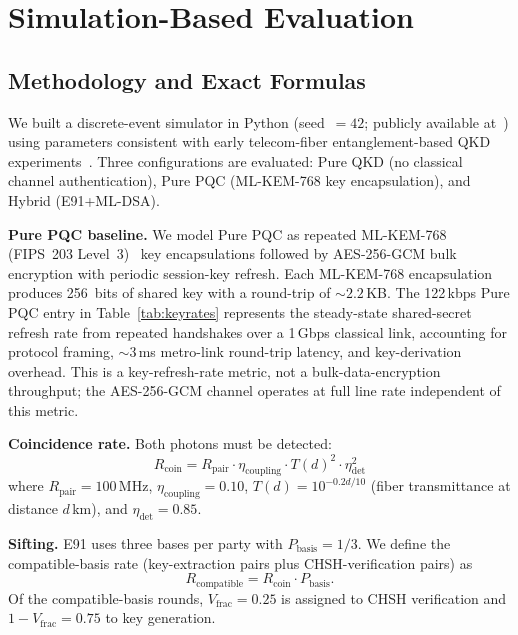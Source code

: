 \documentclass[conference]{IEEEtran}
\begin{document}
\section{Simulation-Based Evaluation}
\label{sec:simulation}

\subsection{Methodology and Exact Formulas}
\label{sec:methodology}
We built a discrete-event simulator in Python (seed~$=42$; publicly available at~\cite{orthi_rane_zenodo}) using parameters consistent with early telecom-fiber entanglement-based QKD experiments~\cite{poppe2004}. Three configurations are evaluated: Pure QKD (no classical channel authentication), Pure PQC (ML-KEM-768 key encapsulation), and Hybrid (E91+ML-DSA).

\textbf{Pure PQC baseline.} We model Pure PQC as repeated ML-KEM-768 (FIPS~203 Level~3)~\cite{fips203} key encapsulations followed by AES-256-GCM bulk encryption with periodic session-key refresh. Each ML-KEM-768 encapsulation produces 256~bits of shared key with a round-trip of $\sim 2.2$\,KB. The 122\,kbps Pure PQC entry in Table~\ref{tab:keyrates} represents the steady-state shared-secret refresh rate from repeated handshakes over a 1\,Gbps classical link, accounting for protocol framing, $\sim 3$\,ms metro-link round-trip latency, and key-derivation overhead. This is a key-refresh-rate metric, not a bulk-data-encryption throughput; the AES-256-GCM channel operates at full line rate independent of this metric.

\textbf{Coincidence rate.} Both photons must be detected:
\begin{equation}
R_{\mathrm{coin}} = R_{\mathrm{pair}} \cdot \eta_{\mathrm{coupling}} \cdot T(d)^2 \cdot \eta_{\mathrm{det}}^2 \label{eq:coin}
\end{equation}
where $R_{\mathrm{pair}} = 100$\,MHz, $\eta_{\mathrm{coupling}} = 0.10$, $T(d) = 10^{-0.2d/10}$ (fiber transmittance at distance $d$\,km), and $\eta_{\mathrm{det}} = 0.85$.

\textbf{Sifting.} E91 uses three bases per party with $P_{\mathrm{basis}} = 1/3$. We define the compatible-basis rate (key-extraction pairs plus CHSH-verification pairs) as
\begin{equation}
R_{\mathrm{compatible}} = R_{\mathrm{coin}} \cdot P_{\mathrm{basis}}. \label{eq:rcomp}
\end{equation}
Of the compatible-basis rounds, $V_{\mathrm{frac}} = 0.25$ is assigned to CHSH verification and $1 - V_{\mathrm{frac}} = 0.75$ to key generation.
\end{document}
